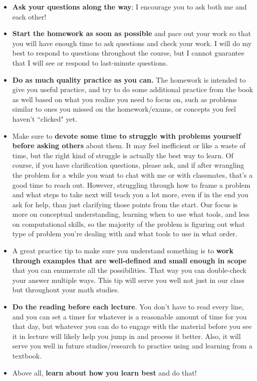 \documentclass{article}
\begin{document}
\begin{itemize}
    \item \textbf{Ask your questions along the way}; I encourage you to ask both me and each other!
    \item \textbf{Start the homework as soon as possible} and pace out your work so that you will have enough time to ask questions and check your work.  I will do my best to respond to questions throughout the course, but I cannot guarantee that I will see or respond to last-minute questions.
    \item \textbf{Do as much quality practice as you can.} The homework is intended to give you useful practice, and try to do some additional practice from the book as well based on what you realize you need to focus on, such as problems similar to ones you missed on the homework/exams, or concepts you feel haven't ``clicked" yet.
    \item Make sure to \textbf{devote some time to struggle with problems yourself before asking others} about them. It may feel inefficient or like a waste of time, but the right kind of struggle is actually the best way to learn. Of course, if you have clarification questions, please ask, and if after wrangling the problem for a while you want to chat with me or with classmates, that's a good time to reach out. However, struggling through how to frame a problem and what steps to take next will teach you a lot more, even if in the end you ask for help, than just clarifying those points from the start. Our focus is more on conceptual understanding, learning when to use what tools, and less on computational skills, so the majority of the problem is figuring out what type of problem you're dealing with and what tools to use in what order.
    \item A great practice tip to make sure you understand something is to \textbf{work through examples that are well-defined and small enough in scope} that you can enumerate all the possibilities. That way you can double-check your answer multiple ways. This tip will serve you well not just in our class but throughout your math studies.
    \item \textbf{Do the reading before each lecture}. You don't have to read every line, and you can set a timer for whatever is a reasonable amount of time for you that day, but whatever you can do to engage with the material before you see it in lecture will likely help you jump in and process it better. Also, it will serve you well in future studies/research to practice using and learning from a textbook.
    \item Above all, \textbf{learn about how you learn best} and do that!
\end{itemize}
\end{document}
